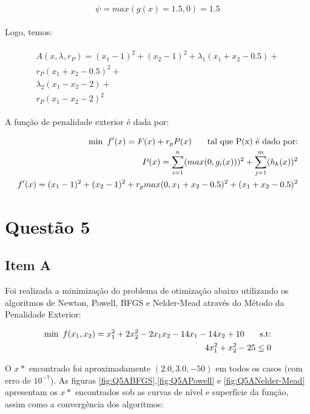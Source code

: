 \documentclass[a4paper, 12pt]{article}
\begin{document}
\begin{align*}
\begin{split}
\psi = max(g(x) = 1.5, 0 ) = 1.5
\end{split}
\end{align*}


Logo, temos:

\begin{align*}
\begin{split}
A(x, \lambda, r_P) = (x_1 - 1)^2 + (x_2 - 1)^2 + \lambda_1 (x_1 + x_2 - 0.5) + \\ 
r_P (x_1 + x_2 - 0.5)^2 + \\
\lambda_2 (x_1 - x_2 - 2) + \\
r_P (x_1 - x_2 - 2)^2
\end{split}
\end{align*}

A função de penalidade exterior é dada por:

\begin{align*}
\begin{split}
\text{min\phantom{0}} f'(x) = F(x) + r_p P(x) \text{\phantom{000} tal que P(x) é dado por:} \\
P(x) = \sum_{i=1}^{n} (max(0,g_i(x)))^2 + \sum_{j=1}^{m} (h_k(x))^2 \\
f'(x) = (x_1-1)^2 + (x_2-1)^2 + r_p max (0,x_1 + x_2 - 0.5)^2 + (x_1 + x_2 - 0.5)^2
\end{split}
\end{align*}

\newpage
\section*{Questão 5}
\subsection*{Item A}
Foi realizada a minimização do problema de otimização abaixo utilizando os algoritmos de Newton, Powell, BFGS e Nelder-Mead através do Método da Penalidade Exterior:

\begin{align*}
\begin{split}
\text{min\phantom{0}} f(x_1,x_2) = x_1^2 + 2 x_2^2 - 2x_1 x_2 - 14x_1 - 14x_2 + 10 \text{\phantom{000} s.t:} \\
4x_1^2 + x_2^2 -25 \leq 0
\end{split}
\end{align*}

O $x*$ encontrado foi aproximadamente $(2.0, 3.0, -50)$ em todos os casos (com erro de $10^{-7}$). As figuras \ref{fig:Q5ABFGS},\ref{fig:Q5APowell} e \ref{fig:Q5ANelder-Mead} apresentam os $x*$ encontrados sob as curvas de nível e superfície da função, assim como a convergência dos algoritmos:
\end{document}

